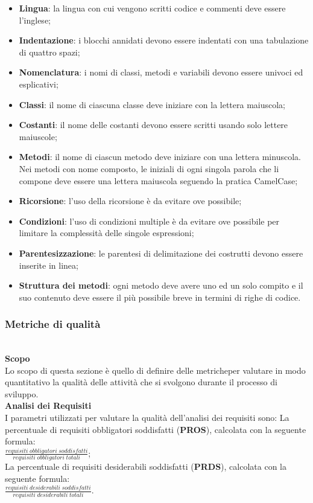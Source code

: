 \begin{itemize}
	\item \textbf{Lingua}: la lingua con cui vengono scritti codice e commenti deve essere l'inglese;
	\item \textbf{Indentazione}: i blocchi annidati devono essere indentati con una tabulazione di quattro spazi;
	\item \textbf{Nomenclatura}: i nomi di classi, metodi e variabili devono essere univoci ed esplicativi;
	\item \textbf{Classi}: il nome di ciascuna classe deve iniziare con la lettera maiuscola; 
	\item \textbf{Costanti}: il nome delle costanti devono essere scritti usando solo lettere maiuscole;
	\item \textbf{Metodi}: il nome di ciascun metodo deve iniziare con una lettera minuscola. Nei metodi con nome composto, le iniziali di ogni singola parola che li compone deve essere una lettera maiuscola seguendo la pratica CamelCase;
	\item \textbf{Ricorsione}: l'uso della ricorsione è da evitare ove possibile;
	\item \textbf{Condizioni}: l'uso di condizioni multiple è da evitare ove possibile per limitare la complessità delle singole espressioni;
	\item \textbf{Parentesizzazione}: le parentesi di delimitazione dei costrutti devono essere inserite in linea;
	\item \textbf{Struttura dei metodi}: ogni metodo deve avere uno ed un solo compito e il suo contenuto deve essere il più possibile breve in termini di righe di codice.
\end{itemize}
\subsubsection{Metriche di qualità}\mbox{}\\ [1mm]
\textbf{Scopo}\\
Lo scopo di questa sezione è quello di definire delle metriche\glosp per valutare in modo quantitativo la qualità delle attività che si svolgono durante il processo di sviluppo.
\\\textbf{Analisi dei Requisiti}\\
I parametri utilizzati per valutare la qualità dell'analisi dei requisiti sono:
La percentuale di requisiti obbligatori soddisfatti (\textbf{PROS}), calcolata con la seguente formula: \\
	$\frac{requisiti \; obbligatori \; soddisfatti}{requisiti \; obbligatori \; totali}$; \\
La percentuale di requisiti desiderabili soddisfatti (\textbf{PRDS}), calcolata con la seguente formula: \\
	$\frac{requisiti \; desiderabili \; soddisfatti}{requisiti \; desiderabili \; totali}$.
